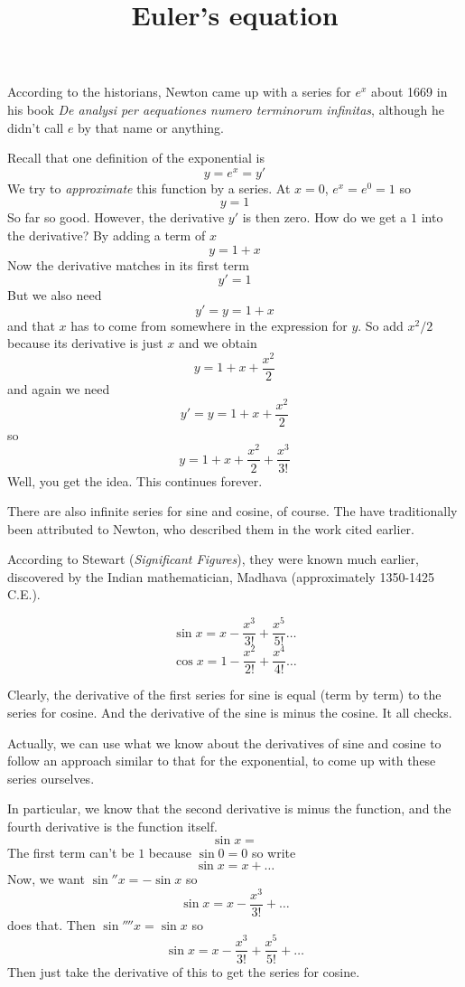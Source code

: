 \documentclass[11pt, oneside]{article}
\title{Euler's equation}
\date{}
\begin{document}
\maketitle
\Large

\label{sec:Euler_quickly}
According to the historians, Newton came up with a series for $e^x$ about 1669 in his book \emph{De analysi per aequationes numero terminorum infinitas}, although he didn't call $e$ by that name or anything.

Recall that one definition of the exponential is
\[ y = e^x = y'  \]
We try to \emph{approximate} this function by a series.  At $x = 0$, $e^x = e^0 = 1$ so
\[ y = 1 \]
So far so good.  However, the derivative $y'$ is then zero.  How do we get a $1$ into the derivative?  By adding a term of $x$
\[ y = 1 + x \]
Now the derivative matches in its first term
\[ y' = 1 \]
But we also need 
\[ y' = y = 1 + x \]
and that $x$ has to come from somewhere in the expression for $y$.  So add $x^2/2$ because its derivative is just $x$ and we obtain
\[ y = 1 + x + \frac{x^2}{2} \]
and again we need 
\[ y' = y = 1 + x + \frac{x^2}{2} \]
so
\[ y = 1 + x + \frac{x^2}{2} + \frac{x^3}{3!} \]
Well, you get the idea.  This continues forever.

There are also infinite series for sine and cosine, of course.  The have traditionally been attributed to Newton, who described them in the work cited earlier.

According to Stewart (\emph{Significant Figures}), they were known much earlier, discovered by the Indian mathematician, Madhava (approximately 1350-1425 C.E.).

\[ \sin x = x - \frac{x^3}{3!} + \frac{x^5}{5!} \dots \]
\[ \cos x = 1 - \frac{x^2}{2!} + \frac{x^4}{4!} \dots \]

Clearly, the derivative of the first series for sine is equal (term by term) to the series for cosine.  And the derivative of the sine is minus the cosine.  It all checks.

Actually, we can use what we know about the derivatives of sine and cosine to follow an approach similar to that for the exponential, to come up with these series ourselves. 

In particular, we know that the second derivative is minus the function, and the fourth derivative is the function itself.
\[ \sin x = \]
The first term can't be $1$ because $\sin 0 = 0$ so write
\[ \sin x = x + \dots \]
Now, we want $\sin'' x = - \sin x$ so
\[ \sin x = x - \frac{x^3}{3!} + \dots \]
does that.  Then $\sin'''' x = \sin x$ so
\[ \sin x = x - \frac{x^3}{3!} + \frac{x^5}{5!} + \dots \]
Then just take the derivative of this to get the series for cosine.
\end{document}
